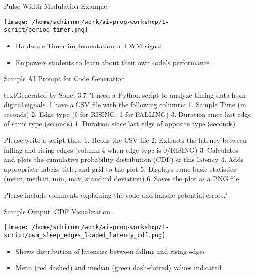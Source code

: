 \documentclass[xcolor={dvipsnames}, aspectratio=169]{beamer}
\begin{document}
\begin{frame}{Pulse Width Modulation Example}
  \begin{center}
    \texttt{[image: /home/schirner/work/ai-prog-workshop/1-script/period\_timer.png]}
  \end{center}
  \begin{itemize}
    \item Hardware Timer implementation of PWM signal
    \item Empowers students to learn about their own code's performance
  \end{itemize}
\end{frame}

\begin{frame}[fragile]{Sample AI Prompt for Code Generation}
  \begin{codeboxtc}{text}{Generated by Sonet 3.7}{}{}
"I need a Python script to analyze timing data from digital signals. I have a CSV file with the following columns:
1. Sample Time (in seconds)
2. Edge type (0 for RISING, 1 for FALLING)
3. Duration since last edge of same type (seconds)
4. Duration since last edge of opposite type (seconds)

Please write a script that:
1. Reads the CSV file
2. Extracts the latency between falling and rising edges (column 4 when edge type is 0/RISING)
3. Calculates and plots the cumulative probability distribution (CDF) of this latency
4. Adds appropriate labels, title, and grid to the plot
5. Displays some basic statistics (mean, median, min, max, standard deviation)
6. Saves the plot as a PNG file

Please include comments explaining the code and handle potential errors."
  \end{codeboxtc}
\end{frame}

\begin{frame}{Sample Output: CDF Visualization}
  \begin{center}
    \texttt{[image: /home/schirner/work/ai-prog-workshop/1-script/pwm\_sleep\_edges\_loaded\_latency\_cdf.png]}
  \end{center}
  \begin{itemize}
    \item Shows distribution of latencies between falling and rising edges
    \item Mean (red dashed) and median (green dash-dotted) values indicated
  \end{itemize}
\end{frame}
\end{document}
